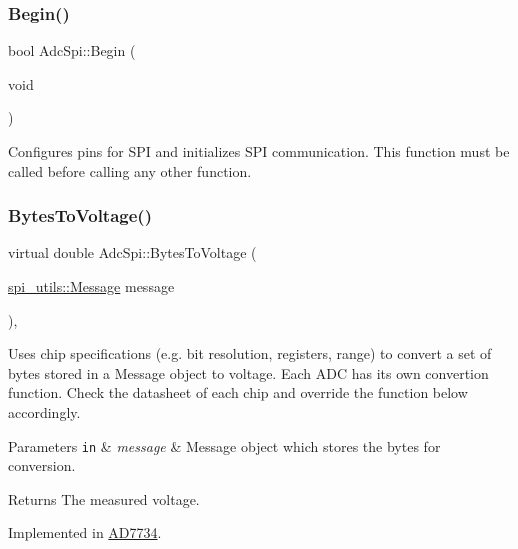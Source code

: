 \subsubsection{\texorpdfstring{Begin()}{Begin()}}
{\footnotesize\ttfamily bool Adc\+Spi\+::\+Begin (\begin{DoxyParamCaption}\item[{void}]{ }\end{DoxyParamCaption})}

Configures pins for S\+PI and initializes S\+PI communication. This function must be called before calling any other function. \mbox{\label{classAdcSpi_a25a1deb55a9f0e71a405ca47a41f3804}} 
\subsubsection{\texorpdfstring{Bytes\+To\+Voltage()}{BytesToVoltage()}}
{\footnotesize\ttfamily virtual double Adc\+Spi\+::\+Bytes\+To\+Voltage (\begin{DoxyParamCaption}\item[{\mbox{\hyperlink{structspi__utils_1_1Message}{spi\+\_\+utils\+::\+Message}}}]{message }\end{DoxyParamCaption})\hspace{0.3cm}{\ttfamily [protected]}, {}}

Uses chip specifications (e.\+g. bit resolution, registers, range) to convert a set of bytes stored in a Message object to voltage. Each A\+DC has its own convertion function. Check the datasheet of each chip and override the function below accordingly. 
\begin{DoxyParams}[1]{Parameters}
\mbox{\tt in}  & {\em message} & Message object which stores the bytes for conversion. \\
\hline
\end{DoxyParams}
\begin{DoxyReturn}{Returns}
The measured voltage. 
\end{DoxyReturn}


Implemented in \mbox{\hyperlink{classAD7734_aa13b49141e69a45508998004a208afdc}{A\+D7734}}.

\mbox{\label{classAdcSpi_a3578f18e1976d9e2b075a3fbdc003517}} 
